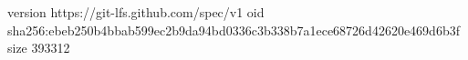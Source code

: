 version https://git-lfs.github.com/spec/v1
oid sha256:ebeb250b4bbab599ec2b9da94bd0336c3b338b7a1ece68726d42620e469d6b3f
size 393312
